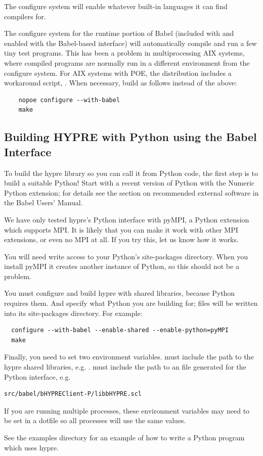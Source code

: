 The configure system will enable whatever built-in languages it can
find compilers for.

The configure system for the runtime portion of Babel (included with
\hypre{} and enabled with the Babel-based interface) will
automatically compile and run a few tiny test programs.  This has been
a problem in multiprocessing AIX systems, where compiled programs are
normally run in a different environment from the configure system.
For AIX systems with POE, the
\hypre{} distribution includes a workaround script, .
When necessary, build \hypre{} as follows instead of the above:

\begin{verbatim}
    nopoe configure --with-babel
    make
\end{verbatim}


\subsection{Building HYPRE with Python using the Babel Interface}
\label{sec-Building-Babel-Python}

To build the hypre library so you can call it from Python code, the
first step is to build a suitable Python!  Start with a recent version
of Python with the Numeric Python extension; for details see the
section on recommended external software in the Babel Users' Manual.

We have only tested hypre's Python interface with pyMPI, a Python
extension which supports MPI.  It is likely that you can make it work
with other MPI extensions, or even no MPI at all.  If you try this,
let us know how it works.

You will need write access to your Python's site-packages directory.
When you install pyMPI it creates another instance of Python, so this
should not be a problem.

You must configure and build hypre with shared libraries, because
Python requires them.  And specify what Python you are building for;
files will be written into its site-packages directory.
For example:
\begin{verbatim}
  configure --with-babel --enable-shared --enable-python=pyMPI
  make
\end{verbatim}

Finally, you need to set two environment variables.
 must include the path to the hypre shared
libraries, e.g. .
 must include the path to an
 file generated for the Python interface,
e.g.\begin{verbatim}
src/babel/bHYPREClient-P/libbHYPRE.scl
\end{verbatim}
If you are running multiple processes, these environment variables may
need to be set in a dotfile so all processes will use the same values.

See the examples directory for an example of how to write a Python
program which uses hypre.
